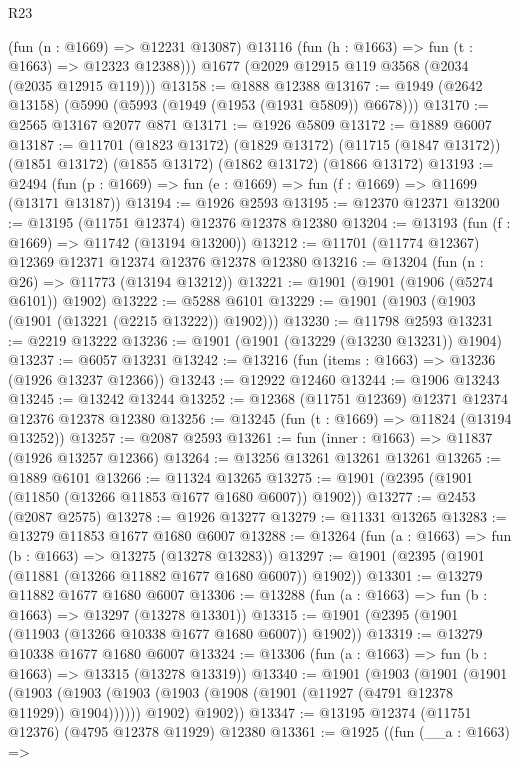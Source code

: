\begin{lexlean}{R23}
\begin{coremodule}
        (fun (n : @1669) => @12231 @13087)
        @13116
        (fun (h : @1663) => fun (t : @1663) => @12323 @12388)))
    @1677
    (@2029 @12915 @119 @3568 (@2034 (@2035 @12915 @119)))
@13158 := @1888 @12388
@13167 := @1949 (@2642 @13158) (@5990 (@5993 (@1949 (@1953 (@1931 @5809)) @6678)))
@13170 := @2565 @13167 @2077 @871
@13171 := @1926 @5809
@13172 := @1889 @6007
@13187 := @11701
    (@1823 @13172)
    (@1829 @13172)
    (@11715 (@1847 @13172))
    (@1851 @13172)
    (@1855 @13172)
    (@1862 @13172)
    (@1866 @13172)
@13193 := @2494 (fun (p : @1669) => fun (e : @1669) => fun (f : @1669) => @11699 (@13171 @13187))
@13194 := @1926 @2593
@13195 := @12370 @12371
@13200 := @13195 (@11751 @12374) @12376 @12378 @12380
@13204 := @13193 (fun (f : @1669) => @11742 (@13194 @13200))
@13212 := @11701 (@11774 @12367) @12369 @12371 @12374 @12376 @12378 @12380
@13216 := @13204 (fun (n : @26) => @11773 (@13194 @13212))
@13221 := @1901 (@1901 (@1906 (@5274 @6101)) @1902)
@13222 := @5288 @6101
@13229 := @1901 (@1903 (@1903 (@1901 (@13221 (@2215 @13222)) @1902)))
@13230 := @11798 @2593
@13231 := @2219 @13222
@13236 := @1901 (@1901 (@13229 (@13230 @13231)) @1904)
@13237 := @6057 @13231
@13242 := @13216 (fun (items : @1663) => @13236 (@1926 @13237 @12366))
@13243 := @12922 @12460
@13244 := @1906 @13243
@13245 := @13242 @13244
@13252 := @12368 (@11751 @12369) @12371 @12374 @12376 @12378 @12380
@13256 := @13245 (fun (t : @1669) => @11824 (@13194 @13252))
@13257 := @2087 @2593
@13261 := fun (inner : @1663) => @11837 (@1926 @13257 @12366)
@13264 := @13256 @13261 @13261 @13261
@13265 := @1889 @6101
@13266 := @11324 @13265
@13275 := @1901 (@2395 (@1901 (@11850 (@13266 @11853 @1677 @1680 @6007)) @1902))
@13277 := @2453 (@2087 @2575)
@13278 := @1926 @13277
@13279 := @11331 @13265
@13283 := @13279 @11853 @1677 @1680 @6007
@13288 := @13264 (fun (a : @1663) => fun (b : @1663) => @13275 (@13278 @13283))
@13297 := @1901 (@2395 (@1901 (@11881 (@13266 @11882 @1677 @1680 @6007)) @1902))
@13301 := @13279 @11882 @1677 @1680 @6007
@13306 := @13288 (fun (a : @1663) => fun (b : @1663) => @13297 (@13278 @13301))
@13315 := @1901 (@2395 (@1901 (@11903 (@13266 @10338 @1677 @1680 @6007)) @1902))
@13319 := @13279 @10338 @1677 @1680 @6007
@13324 := @13306 (fun (a : @1663) => fun (b : @1663) => @13315 (@13278 @13319))
@13340 := @1901
    (@1903
      (@1901
        (@1901
          (@1903 (@1903 (@1903 (@1903 (@1908 (@1901 (@11927 (@4791 @12378 @11929)) @1904))))))
          @1902)
        @1902))
@13347 := @13195 @12374 (@11751 @12376) (@4795 @12378 @11929) @12380
@13361 := @1925
    ((fun (__a : @1663) =>

\end{coremodule}
\end{lexlean}
